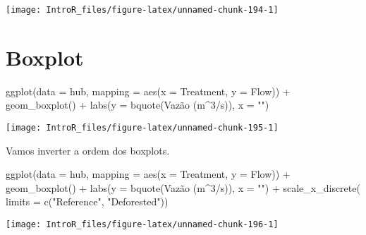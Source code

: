 \documentclass[
]{book}
\newenvironment{Shaded}{\begin{snugshade}}{\end{snugshade}}
\newcommand{\AttributeTok}[1]{\textcolor[rgb]{0.77,0.63,0.00}{#1}}
\newcommand{\DecValTok}[1]{\textcolor[rgb]{0.00,0.00,0.81}{#1}}
\newcommand{\FunctionTok}[1]{\textcolor[rgb]{0.00,0.00,0.00}{#1}}
\newcommand{\NormalTok}[1]{#1}
\newcommand{\SpecialCharTok}[1]{\textcolor[rgb]{0.00,0.00,0.00}{#1}}
\newcommand{\StringTok}[1]{\textcolor[rgb]{0.31,0.60,0.02}{#1}}
\begin{document}
\begin{center}\texttt{[image: IntroR\_files/figure-latex/unnamed-chunk-194-1]} \end{center}

\hypertarget{boxplot-2}{%
\section{Boxplot}\label{boxplot-2}}

\begin{Shaded}
\begin{Highlighting}[]
\FunctionTok{ggplot}\NormalTok{(}\AttributeTok{data =}\NormalTok{ hub, }\AttributeTok{mapping =} \FunctionTok{aes}\NormalTok{(}\AttributeTok{x =}\NormalTok{ Treatment, }\AttributeTok{y =}\NormalTok{ Flow)) }\SpecialCharTok{+}
  \FunctionTok{geom\_boxplot}\NormalTok{() }\SpecialCharTok{+}
  \FunctionTok{labs}\NormalTok{(}\AttributeTok{y =} \FunctionTok{bquote}\NormalTok{(Vazão (m}\SpecialCharTok{\^{}}\DecValTok{3}\SpecialCharTok{/}\NormalTok{s)),}
       \AttributeTok{x =} \StringTok{""}\NormalTok{)}
\end{Highlighting}
\end{Shaded}

\begin{center}\texttt{[image: IntroR\_files/figure-latex/unnamed-chunk-195-1]} \end{center}

Vamos inverter a ordem dos boxplots.

\begin{Shaded}
\begin{Highlighting}[]
\FunctionTok{ggplot}\NormalTok{(}\AttributeTok{data =}\NormalTok{ hub, }\AttributeTok{mapping =} \FunctionTok{aes}\NormalTok{(}\AttributeTok{x =}\NormalTok{ Treatment, }\AttributeTok{y =}\NormalTok{ Flow)) }\SpecialCharTok{+}
  \FunctionTok{geom\_boxplot}\NormalTok{() }\SpecialCharTok{+}
  \FunctionTok{labs}\NormalTok{(}\AttributeTok{y =} \FunctionTok{bquote}\NormalTok{(Vazão (m}\SpecialCharTok{\^{}}\DecValTok{3}\SpecialCharTok{/}\NormalTok{s)),}
       \AttributeTok{x =} \StringTok{""}\NormalTok{) }\SpecialCharTok{+}
  \FunctionTok{scale\_x\_discrete}\NormalTok{(}
    \AttributeTok{limits =} \FunctionTok{c}\NormalTok{(}\StringTok{"Reference"}\NormalTok{, }\StringTok{"Deforested"}\NormalTok{))}
\end{Highlighting}
\end{Shaded}

\begin{center}\texttt{[image: IntroR\_files/figure-latex/unnamed-chunk-196-1]} \end{center}
\end{document}
